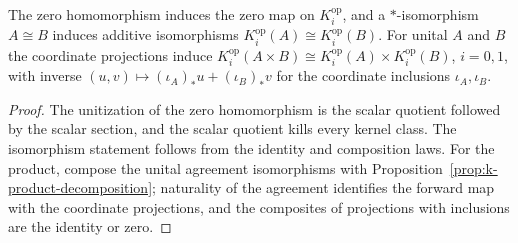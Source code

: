 \begin{corollary}\label{cor:operator-k-zero-iso-product}
\leanok
The zero homomorphism induces the zero map on $K_i^{\mathrm{op}}$, and a
$*$-isomorphism $A\cong B$ induces additive isomorphisms
$K_i^{\mathrm{op}}(A)\cong K_i^{\mathrm{op}}(B)$. For unital $A$ and $B$ the
coordinate projections induce
$K_i^{\mathrm{op}}(A\times B)\cong K_i^{\mathrm{op}}(A)\times K_i^{\mathrm{op}}(B)$,
$i=0,1$, with inverse $(u,v)\mapsto(\iota_A)_*u+(\iota_B)_*v$ for the coordinate
inclusions $\iota_A,\iota_B$.
\end{corollary}
\begin{proof}
\leanok
The unitization of the zero homomorphism is the scalar quotient followed by the
scalar section, and the scalar quotient kills every kernel class. The isomorphism
statement follows from the identity and composition laws. For the product, compose
the unital agreement isomorphisms with Proposition~\ref{prop:k-product-decomposition};
naturality of the agreement identifies the forward map with the coordinate
projections, and the composites of projections with inclusions are the identity or
zero.
\end{proof}

